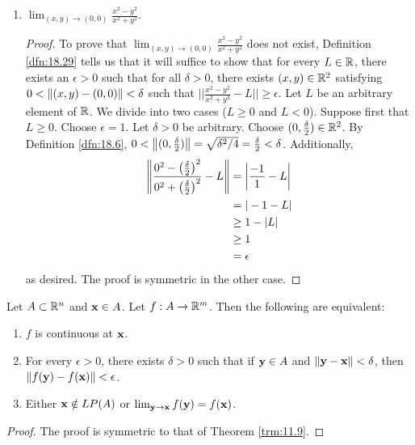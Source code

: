 \documentclass[../main.tex]{subfiles}
\begin{document}
\begin{exercise}
\begin{enumerate}[label={(\alph*)},ref={\theexercise\alph*}]
\begin{proof}
\begin{align*}
                &= \frac{9}{\epsilon^2}\left( \frac{2\epsilon^3}{27}+\frac{\epsilon^3}{27} \right)\\
                &= \frac{9}{\epsilon^2}\cdot\frac{\epsilon^3}{9}\\
                &= \epsilon
            \end{align*}
            as desired.
        \end{proof}
        \item \label{exr:18.30c}$\lim_{(x,y)\to(0,0)}\frac{x^2-y^2}{x^2+y^2}$.
        \begin{proof}
            To prove that $\lim_{(x,y)\to(0,0)}\frac{x^2-y^2}{x^2+y^2}$ does not exist, Definition \ref{dfn:18.29} tells us that it will suffice to show that for every $L\in\mathbb{R}$, there exists an $\epsilon>0$ such that for all $\delta>0$, there exists $(x,y)\in\mathbb{R}^2$ satisfying $0<\norm{(x,y)-(0,0)}<\delta$ such that $||\frac{x^2-y^2}{x^2+y^2}-L||\geq\epsilon$. Let $L$ be an arbitrary element of $\mathbb{R}$. We divide into two cases ($L\geq 0$ and $L<0$). Suppose first that $L\geq 0$. Choose $\epsilon=1$. Let $\delta>0$ be arbitrary. Choose $(0,\frac{\delta}{2})\in\mathbb{R}^2$. By Definition \ref{dfn:18.6}, $0<\norm{(0,\frac{\delta}{2})}=\sqrt{\delta^2/4}=\frac{\delta}{2}<\delta$. Additionally,
            \begin{align*}
                \norm{\frac{0^2-\left( \frac{\delta}{2} \right)^2}{0^2+\left( \frac{\delta}{2} \right)^2}-L} &= \left| \frac{-1}{1}-L \right|\\
                &= |-1-L|\\
                &\geq 1-|L|\\
                &\geq 1\\
                &= \epsilon
            \end{align*}
            as desired. The proof is symmetric in the other case.
        \end{proof}
    \end{enumerate}
\end{exercise}

\begin{theorem}\label{trm:18.31}
    Let $A\subset\mathbb{R}^n$ and $\mathbf{x}\in A$. Let $f:A\to\mathbb{R}^m$. Then the following are equivalent:
    \begin{enumerate}[label={\textup{(}\alph*\textup{)}}]
        \item $f$ is continuous at $\mathbf{x}$.
        \item For every $\epsilon>0$, there exists $\delta>0$ such that if $\mathbf{y}\in A$ and $\norm{\mathbf{y}-\mathbf{x}}<\delta$, then $\norm{f(\mathbf{y})-f(\mathbf{x})}<\epsilon$.
        \item Either $\mathbf{x}\notin LP(A)$ or $\lim_{\mathbf{y}\to\mathbf{x}}f(\mathbf{y})=f(\mathbf{x})$.
    \end{enumerate}
    \begin{proof}
        The proof is symmetric to that of Theorem \ref{trm:11.9}.
    \end{proof}
\end{theorem}
\end{document}

